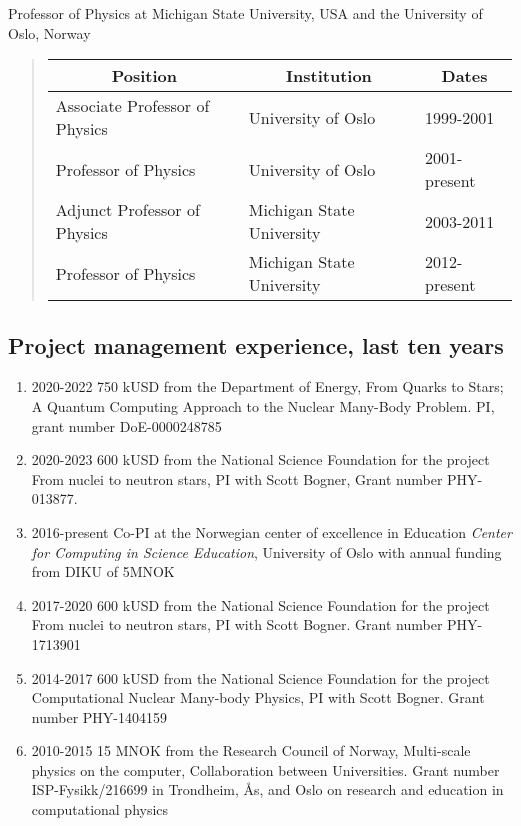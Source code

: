 \documentclass[11pt]{revtex4-1}
\begin{document}
Professor of Physics at Michigan State University, USA and the University of Oslo, Norway
\begin{quote}
\begin{tabular}{|l|l|l|}
\hline
\multicolumn{1}{|c}{ Position } & \multicolumn{1}{|c}{ Institution } & \multicolumn{1}{|c|}{ Dates } \\
\hline
Associate Professor of Physics & University of Oslo        & 1999-2001    \\
Professor of Physics           & University of Oslo        & 2001-present \\
Adjunct Professor of Physics   & Michigan State University & 2003-2011    \\
Professor of Physics           & Michigan State University & 2012-present \\
\hline
\end{tabular}
\end{quote}




\subsection*{Project management experience, last ten years}
\begin{enumerate}

\item 2020-2022 750 kUSD from the Department of Energy, From Quarks to Stars; A Quantum Computing Approach to the Nuclear Many-Body Problem. PI, grant number DoE-0000248785  

\item 2020-2023 600 kUSD from the National Science Foundation for the project From nuclei to neutron stars, PI with Scott Bogner, Grant number PHY-013877. 

\item 2016-present Co-PI  at the Norwegian center of excellence in Education \emph{Center for Computing in Science Education}, University of Oslo with annual funding from DIKU of 5MNOK

\item 2017-2020 600 kUSD from the National Science Foundation for the project From nuclei to neutron stars, PI with Scott Bogner. Grant number PHY-1713901

\item 2014-2017 600 kUSD from the National Science Foundation for the project Computational Nuclear Many-body Physics, PI with Scott Bogner. Grant number PHY-1404159

\item 2010-2015 15 MNOK from the Research Council of Norway, Multi-scale physics on the computer, Collaboration between Universities. Grant number ISP-Fysikk/216699 in Trondheim, Ås, and Oslo on research and education in computational physics

\end{enumerate}
\end{document}
